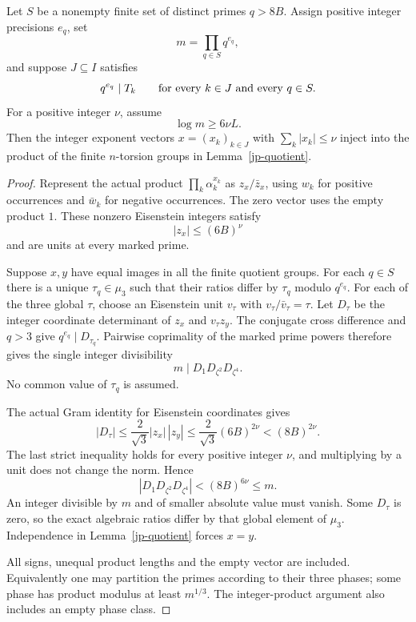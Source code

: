 \begin{theorem}
\label{jp-rigidity}
Let \(S\) be a nonempty finite set of distinct primes \(q>8B\).
Assign positive integer precisions \(e_q\), set
\[
 m=\prod_{q\in S}q^{e_q},
\]
and suppose \(J\subseteq I\) satisfies
\[
 q^{e_q}\mid T_k\qquad\hbox{for every }k\in J
                   \hbox{ and every }q\in S.
\]
For a positive integer \(\nu\), assume
\[
 \log m\ge 6\nu L.
\]
Then the integer exponent vectors \(x=(x_k)_{k\in J}\) with
\(\sum_k|x_k|\le\nu\) inject into the product of the finite
\(n\)-torsion groups in Lemma~\ref{jp-quotient}.
\end{theorem}
\begin{proof}
Represent the actual product \(\prod_k\alpha_k^{x_k}\) as
\(z_x/\bar z_x\), using \(w_k\) for positive occurrences and
\(\bar w_k\) for negative occurrences. The zero vector uses the empty
product \(1\). These nonzero Eisenstein integers satisfy
\[
 |z_x|\le(6B)^\nu
\]
and are units at every marked prime.

Suppose \(x,y\) have equal images in all the finite quotient groups.
For each \(q\in S\) there is a unique \(\tau_q\in\mu_3\) such that their
ratios differ by \(\tau_q\) modulo \(q^{e_q}\).
For each of the three global \(\tau\), choose an Eisenstein unit \(v_\tau\)
with \(v_\tau/\bar v_\tau=\tau\). Let \(D_\tau\) be the integer coordinate
determinant of \(z_x\) and \(v_\tau z_y\).
The conjugate cross difference and \(q>3\) give
\(q^{e_q}\mid D_{\tau_q}\). Pairwise coprimality of the marked prime
powers therefore gives the single integer divisibility
\[
 m\mid D_1D_{\zeta^2}D_{\zeta^4}.
\]
No common value of \(\tau_q\) is assumed.

The actual Gram identity for Eisenstein coordinates gives
\[
 |D_\tau|
 \le\frac{2}{\sqrt3}|z_x|\,|z_y|
 \le\frac{2}{\sqrt3}(6B)^{2\nu}
 <(8B)^{2\nu}.
\]
The last strict inequality holds for every positive integer \(\nu\),
and multiplying by a unit does not change the norm. Hence
\[
 |D_1D_{\zeta^2}D_{\zeta^4}|<(8B)^{6\nu}\le m.
\]
An integer divisible by \(m\) and of smaller absolute value must vanish.
Some \(D_\tau\) is zero, so the exact algebraic ratios differ by that
global element of \(\mu_3\). Independence in Lemma~\ref{jp-quotient}
forces \(x=y\).

All signs, unequal product lengths and the empty vector are included.
Equivalently one may partition the primes according to their three
phases; some phase has product modulus at least \(m^{1/3}\).
The integer-product argument also includes an empty phase class.
\end{proof}

